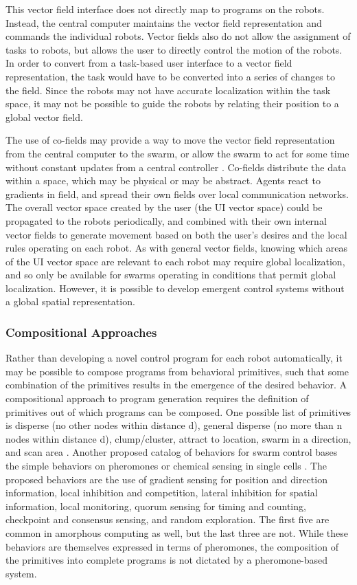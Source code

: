 \documentclass[]{article}
\begin{document}
This vector field interface does not directly map to programs on the robots. 
Instead, the central computer maintains the vector field representation and commands the individual robots.
Vector fields also do not allow the assignment of tasks to robots, but allows the user to directly control the motion of the robots. 
In order to convert from a task-based user interface to a vector field representation, the task would have to be converted into a series of changes to the field.
Since the robots may not have accurate localization within the task space, it may not be possible to guide the robots by relating their position to a global vector field. 

The use of co-fields may provide a way to move the vector field representation from the central computer to the swarm, or allow the swarm to act for some time without constant updates from a central controller \cite{mamei2003co}.
Co-fields distribute the data within a space, which may be physical or may be abstract. 
Agents react to gradients in field, and spread their own fields over local communication networks. 
The overall vector space created by the user (the UI vector space) could be propagated to the robots periodically, and combined with their own internal vector fields to generate movement based on both the user's desires and the local rules operating on each robot. 
As with general vector fields, knowing which areas of the UI vector space are relevant to each robot may require global localization, and so only be available for swarms operating in conditions that permit global localization. 
However, it is possible to develop emergent control systems without a global spatial representation.

\subsubsection{Compositional Approaches}

Rather than developing a novel control program for each robot automatically, it may be possible to compose programs from behavioral primitives, such that some combination of the primitives results in the emergence of the desired behavior. 
A compositional approach to program generation requires the definition of primitives out of which programs can be composed. 
One possible list of primitives is disperse (no other nodes within distance d), general disperse (no more than n nodes within distance d), clump/cluster, attract to location, swarm in a direction, and scan area \cite{evans2000programming}.
Another proposed catalog of behaviors for swarm control bases the simple behaviors on pheromones or chemical sensing in single cells \cite{nagpal2004catalog}. 
The proposed behaviors are the use of gradient sensing for position and direction information, local inhibition and competition, lateral inhibition for spatial information, local monitoring, quorum sensing for timing and counting, checkpoint and consensus sensing, and random exploration. 
The first five are common in amorphous computing as well, but the last three are not. %
While these behaviors are themselves expressed in terms of pheromones, the composition of the primitives into complete programs is not dictated by a pheromone-based system. 
\end{document}
